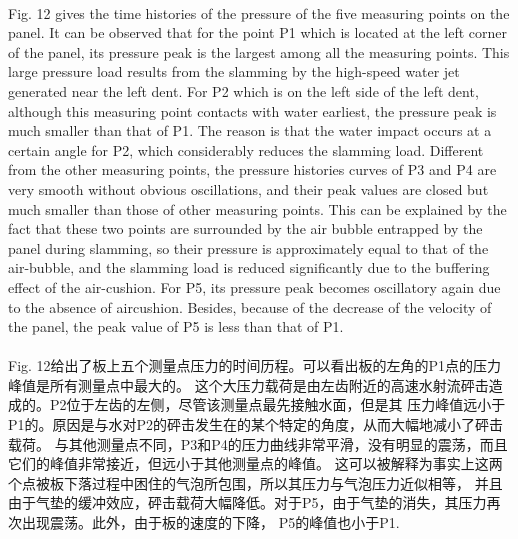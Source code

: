 \documentclass[UTF8]{ctexart}
\begin{document}
\paragraph{\quad}Fig. 12 gives the time histories of the pressure of the five measuring 
                points on the panel. It can be observed that for the point P1 which is 
                located at the left corner of the panel, its pressure peak is the largest 
                among all the measuring points. This large pressure load results from the 
                slamming by the high-speed water jet generated near the left dent. 
                For P2 which is on the left side of the left dent, although this measuring 
                point contacts with water earliest, the pressure peak is much smaller than 
                that of P1. The reason is that the water impact occurs at a certain angle 
                for P2, which considerably reduces the slamming load. Different from the 
                other measuring points, the pressure histories curves of P3 and P4 are very 
                smooth without obvious oscillations, and their peak values are closed but 
                much smaller than those of other measuring points. This can be explained by 
                the fact that these two points are surrounded by the air bubble entrapped by 
                the panel during slamming, so their pressure is approximately equal to that of 
                the air-bubble, and the slamming load is reduced significantly due to the buffering 
                effect of the air-cushion. For P5, its pressure peak becomes oscillatory again due 
                to the absence of aircushion. Besides, because of the decrease of the velocity 
                of the panel, the peak value of P5 is less than that of P1.
\paragraph{\quad}Fig. 12给出了板上五个测量点压力的时间历程。可以看出板的左角的P1点的压力峰值是所有测量点中最大的。
                这个大压力载荷是由左齿附近的高速水射流砰击造成的。P2位于左齿的左侧，尽管该测量点最先接触水面，但是其
                压力峰值远小于P1的。原因是与水对P2的砰击发生在的某个特定的角度，从而大幅地减小了砰击载荷。
                与其他测量点不同，P3和P4的压力曲线非常平滑，没有明显的震荡，而且它们的峰值非常接近，但远小于其他测量点的峰值。
                这可以被解释为事实上这两个点被板下落过程中困住的气泡所包围，所以其压力与气泡压力近似相等，
                并且由于气垫的缓冲效应，砰击载荷大幅降低。对于P5，由于气垫的消失，其压力再次出现震荡。此外，由于板的速度的下降，
                P5的峰值也小于P1.
\end{document}
